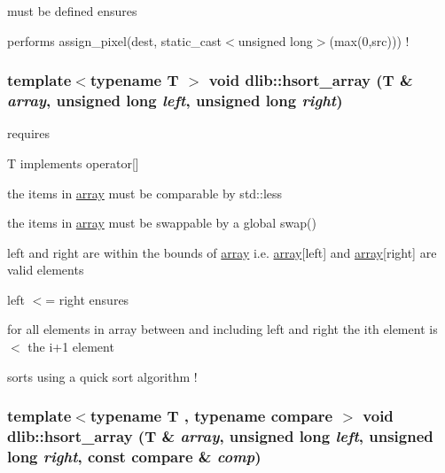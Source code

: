 must be defined ensures
\begin{DoxyItemize}
\item performs assign\_\-pixel(dest, static\_\-cast$<$unsigned long$>$(max(0,src))) ! 
\end{DoxyItemize}\hypertarget{namespacedlib_ad6abbf5d4ec2109706476146835059b7}{
\subsubsection[{hsort\_\-array}]{\setlength{\rightskip}{0pt plus 5cm}template$<$typename T $>$ void dlib::hsort\_\-array (T \& {\em array}, \/  unsigned long {\em left}, \/  unsigned long {\em right})}}
\label{namespacedlib_ad6abbf5d4ec2109706476146835059b7}
requires
\begin{DoxyItemize}
\item T implements operator\mbox{[}\mbox{]}
\item the items in \hyperlink{classdlib_1_1array}{array} must be comparable by std::less
\item the items in \hyperlink{classdlib_1_1array}{array} must be swappable by a global swap()
\item left and right are within the bounds of \hyperlink{classdlib_1_1array}{array} i.e. \hyperlink{classdlib_1_1array}{array}\mbox{[}left\mbox{]} and \hyperlink{classdlib_1_1array}{array}\mbox{[}right\mbox{]} are valid elements
\item left $<$= right ensures
\item for all elements in array between and including left and right the ith element is $<$ the i+1 element
\item sorts using a quick sort algorithm ! 
\end{DoxyItemize}\hypertarget{namespacedlib_ad2483eaef67b51922017370294317395}{
\subsubsection[{hsort\_\-array}]{\setlength{\rightskip}{0pt plus 5cm}template$<$typename T , typename compare $>$ void dlib::hsort\_\-array (T \& {\em array}, \/  unsigned long {\em left}, \/  unsigned long {\em right}, \/  const compare \& {\em comp})}}
